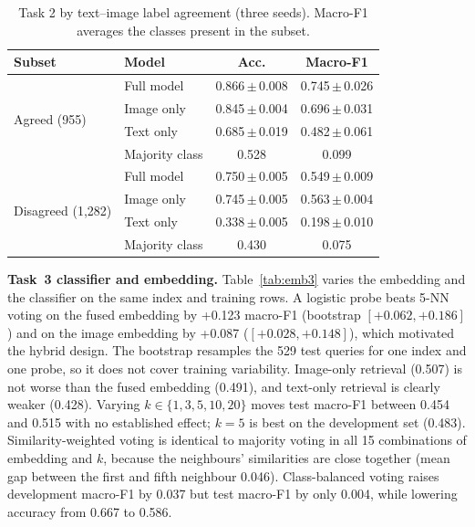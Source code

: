 \documentclass[conference]{IEEEtran}
\newcommand{\pmse}[2]{#1\,$\pm$\,#2}
\begin{document}
\begin{table}[t]
\centering
\caption{Task 2 by text--image label agreement (three seeds). Macro-F1 averages the classes present in the subset.}
\label{tab:agree}
\footnotesize
\setlength{\tabcolsep}{3.5pt}
\begin{tabular}{llcc}
\toprule
Subset & Model & Acc. & Macro-F1 \\
\midrule
\multirow{4}{*}{Agreed (955)} & Full model & \pmse{0.866}{0.008} & \pmse{0.745}{0.026} \\
 & Image only & \pmse{0.845}{0.004} & \pmse{0.696}{0.031} \\
 & Text only & \pmse{0.685}{0.019} & \pmse{0.482}{0.061} \\
 & Majority class & 0.528 & 0.099 \\
\midrule
\multirow{4}{*}{Disagreed (1,282)} & Full model & \pmse{0.750}{0.005} & \pmse{0.549}{0.009} \\
 & Image only & \pmse{0.745}{0.005} & \pmse{0.563}{0.004} \\
 & Text only & \pmse{0.338}{0.005} & \pmse{0.198}{0.010} \\
 & Majority class & 0.430 & 0.075 \\
\bottomrule
\end{tabular}
\end{table}

\textbf{Task~3 classifier and embedding.} Table~\ref{tab:emb3} varies the embedding and the classifier on the same index and training rows. A logistic probe beats 5-NN voting on the fused embedding by +0.123 macro-F1 (bootstrap $[+0.062, +0.186]$) and on the image embedding by +0.087 ($[+0.028, +0.148]$), which motivated the hybrid design. The bootstrap resamples the 529 test queries for one index and one probe, so it does not cover training variability. Image-only retrieval (0.507) is not worse than the fused embedding (0.491), and text-only retrieval is clearly weaker (0.428). Varying $k \in \{1,3,5,10,20\}$ moves test macro-F1 between 0.454 and 0.515 with no established effect; $k=5$ is best on the development set (0.483). Similarity-weighted voting is identical to majority voting in all 15 combinations of embedding and $k$, because the neighbours' similarities are close together (mean gap between the first and fifth neighbour 0.046). Class-balanced voting raises development macro-F1 by 0.037 but test macro-F1 by only 0.004, while lowering accuracy from 0.667 to 0.586.
\end{document}
